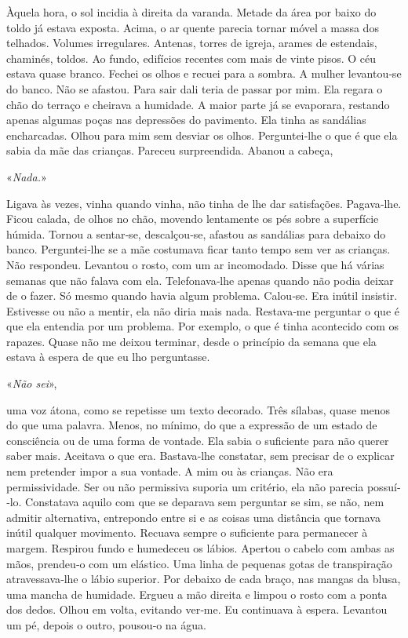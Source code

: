 Àquela hora, o sol incidia à direita da varanda. Metade da área por
baixo do toldo já estava exposta. Acima, o ar quente parecia tornar
móvel a massa dos telhados. Volumes irregulares. Antenas, torres de
igreja, arames de estendais, chaminés, toldos. Ao fundo, edifícios
recentes com mais de vinte pisos. O céu estava quase branco. Fechei os
olhos e recuei para a sombra. A mulher levantou­‑se do banco. Não se
afastou. Para sair dali teria de passar por mim. Ela regara o chão do
terraço e cheirava a humidade. A maior parte já se evaporara, restando
apenas algumas poças nas depressões do pavimento. Ela tinha as sandálias
encharcadas. Olhou para mim sem desviar os olhos. Perguntei­‑lhe o que é
que ela sabia da mãe das crianças. Pareceu surpreendida. Abanou a
cabeça,

«\emph{Nada.}»

Ligava às vezes, vinha quando vinha, não tinha de lhe dar satisfações.
Pagava­‑lhe. Ficou calada, de olhos no chão, movendo lentamente os pés
sobre a superfície húmida. Tornou a sentar­‑se, descalçou­‑se, afastou
as sandálias para debaixo do banco. Perguntei­‑lhe se a mãe costumava
ficar tanto tempo sem ver as crianças. Não respondeu. Levantou o rosto,
com um ar incomodado. Disse que há várias semanas que não falava com
ela. Telefonava­‑lhe apenas quando não podia deixar de o fazer. Só mesmo
quando havia algum problema. Calou­‑se. Era inútil insistir. Estivesse
ou não a mentir, ela não diria mais nada. Restava­‑me perguntar o que é
que ela entendia por um problema. Por exemplo, o que é tinha acontecido
com os rapazes. Quase não me deixou terminar, desde o princípio da
semana que ela estava à espera de que eu lho perguntasse.

«\emph{Não sei}»,

uma voz átona, como se repetisse um texto decorado. Três sílabas, quase
menos do que uma palavra. Menos, no mínimo, do que a expressão de um
estado de consciência ou de uma forma de vontade. Ela sabia o suficiente
para não querer saber mais. Aceitava o que era. Bastava­‑lhe constatar,
sem precisar de o explicar nem pretender impor a sua vontade. A mim ou
às crianças. Não era permissividade. Ser ou não permissiva suporia um
critério, ela não parecia possuí­‑lo. Constatava aquilo com que se
deparava sem perguntar se sim, se não, nem admitir alternativa,
entrepondo entre si e as coisas uma distância que tornava inútil
qualquer movimento. Recuava sempre o suficiente para permanecer à
margem. Respirou fundo e humedeceu os lábios. Apertou o cabelo com ambas
as mãos, prendeu­‑o com um elástico. Uma linha de pequenas gotas de
transpiração atravessava­‑lhe o lábio superior. Por debaixo de cada
braço, nas mangas da blusa, uma mancha de humidade. Ergueu a mão direita
e limpou o rosto com a ponta dos dedos. Olhou em volta, evitando
ver­‑me. Eu continuava à espera. Levantou um pé, depois o outro,
pousou­‑o na água.

